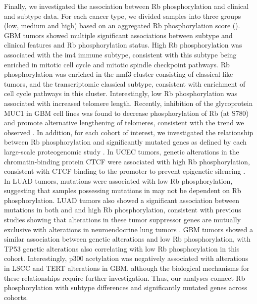 Finally, we investigated the association between Rb phosphorylation and clinical and subtype data. For each cancer type, we divided samples into three groups (low, medium and high) based on an aggregated Rb phosphorylation score (). GBM tumors showed multiple significant associations between subtype and clinical features and Rb phosphorylation status. High Rb phosphorylation was associated with the im4 immune subtype, consistent with this subtype being enriched in mitotic cell cycle and mitotic spindle checkpoint pathways. Rb phosphorylation was enriched in the nmf3 cluster consisting of classical-like tumors, and the transcriptomic classical subtype, consistent with enrichment of cell cycle pathways in this cluster. Interestingly, low Rb phosphorylation was associated with increased telomere length. Recently, inhibition of the glycoprotein MUC1 in GBM cell lines was found to decrease phosphorylation of Rb (at S780) and promote alternative lengthening of telomeres, consistent with the trend we observed \cite{kims_parkck:InhibitionMUC12020}. In addition, for each cohort of interest, we investigated the relationship between Rb phosphorylation and significantly mutated genes as defined by each large-scale proteogenomic study \cite{douy_zhaog:CPTACUCEC2020,gillettema_shiz:ProteogenomicCharacterization2020,wanglb_cptac:GBM2021}. In UCEC tumors, genetic alterations in the chromatin-binding protein CTCF were associated with high Rb phosphorylation, consistent with CTCF binding to the  promoter to prevent epigenetic silencing \cite{rosa-velazqueziadl_recillas-targaf:EpigeneticRegulation2007}. In LUAD tumors,  mutations were associated with low Rb phosphorylation, suggesting that samples possessing mutations in  may not be dependent on Rb phosphorylation. LUAD tumors also showed a significant association between mutations in both  and  and high Rb phosphorylation, consistent with previous studies showing that alterations in these tumor suppressor genes are mutually exclusive with  alterations in neuroendocrine lung tumors \cite{georgej_thomasrk:IntegrativeGenomic2018}. GBM tumors showed a similar association between  genetic alterations and low Rb phosphorylation, with TP53 genetic alterations also correlating with low Rb phosphorylation in this cohort. Interestingly, p300 acetylation was negatively associated with  alterations in LSCC and TERT alterations in GBM, although the biological mechanisms for these relationships require further investigation. Thus, our analyses connect Rb phosphorylation with subtype differences and significantly mutated genes across cohorts.



